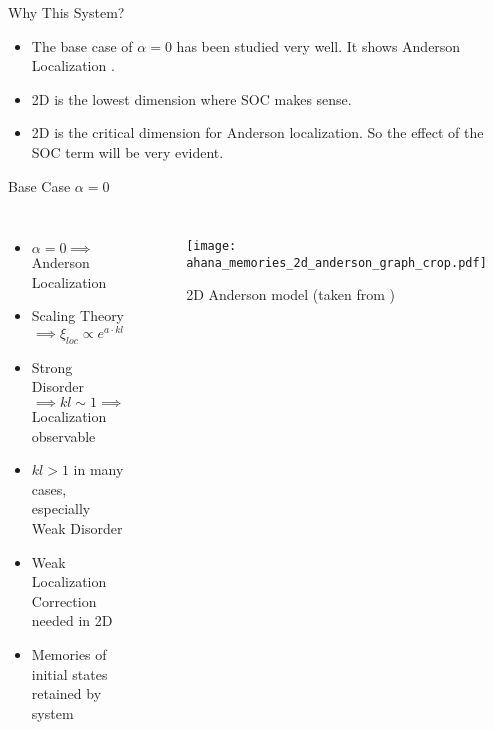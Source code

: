 \documentclass[]{beamer}
\begin{document}
\begin{frame}{Why This System?}
    \begin{itemize}
        \item The base case of $\alpha = 0$ has been studied very well. It shows Anderson Localization \cite{abrahamsScalingTheoryLocalization1979}.
        \pause
        \item 2D is the lowest dimension where SOC makes sense.
        \pause
        \item 2D is the critical dimension for Anderson
        localization. So the effect of the SOC term will be
        very evident.
    \end{itemize}
\end{frame}

\begin{frame}{Base Case \texorpdfstring{$\alpha = 0$}{α = 0}}
    \begin{columns}
            \begin{itemize}
                \item $\alpha = 0 \implies$ Anderson Localization \cite{abrahamsScalingTheoryLocalization1979}
                \pause
                \item Scaling Theory\footnotemark $\implies \xi_{loc} \propto e^{a \cdot kl}$
                \item Strong Disorder $\implies kl \sim 1 \implies$ Localization observable
                \item $kl > 1$ in many cases, especially Weak Disorder
                \pause
                \item Weak Localization Correction needed in 2D
                \pause
                \item Memories of initial states retained by system \cite{chakrabortyMemoriesInitialStates2020}
            \end{itemize}    
            \begin{figure}[l]
                \texttt{[image: ahana\_memories\_2d\_anderson\_graph\_crop.pdf]}
                \caption{2D Anderson model (taken from \cite{chakrabortyMemoriesInitialStates2020})}
            \end{figure}    
    \end{columns}
\end{frame}
\end{document}
